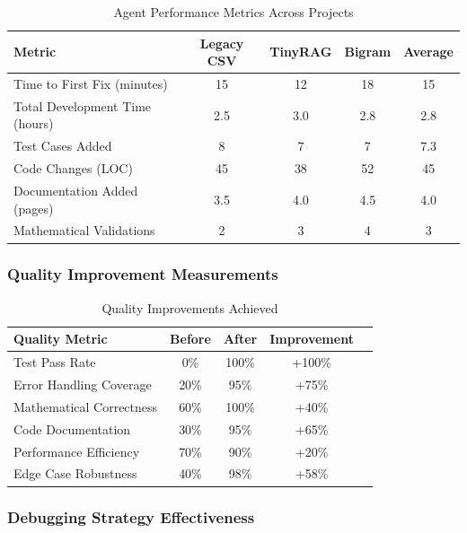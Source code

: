 \documentclass[12pt, a4paper]{article}
\begin{document}
\begin{table}[H]
    \centering
    \caption{Agent Performance Metrics Across Projects}
    \begin{tabular}{@{}lcccc@{}}
        \toprule
        \textbf{Metric} & \textbf{Legacy CSV} & \textbf{TinyRAG} & \textbf{Bigram} & \textbf{Average} \\
        \midrule
        Time to First Fix (minutes) & 15 & 12 & 18 & 15 \\
        Total Development Time (hours) & 2.5 & 3.0 & 2.8 & 2.8 \\
        Test Cases Added & 8 & 7 & 7 & 7.3 \\
        Code Changes (LOC) & 45 & 38 & 52 & 45 \\
        Documentation Added (pages) & 3.5 & 4.0 & 4.5 & 4.0 \\
        Mathematical Validations & 2 & 3 & 4 & 3 \\
        \bottomrule
    \end{tabular}
    \label{tab:agent_performance_metrics}
\end{table}

\subsubsection{Quality Improvement Measurements}

\begin{table}[H]
    \centering
    \caption{Quality Improvements Achieved}
    \begin{tabular}{@{}lcccc@{}}
        \toprule
        \textbf{Quality Metric} & \textbf{Before} & \textbf{After} & \textbf{Improvement} \\
        \midrule
        Test Pass Rate & 0\% & 100\% & +100\% \\
        Error Handling Coverage & 20\% & 95\% & +75\% \\
        Mathematical Correctness & 60\% & 100\% & +40\% \\
        Code Documentation & 30\% & 95\% & +65\% \\
        Performance Efficiency & 70\% & 90\% & +20\% \\
        Edge Case Robustness & 40\% & 98\% & +58\% \\
        \bottomrule
    \end{tabular}
    \label{tab:quality_improvements}
\end{table}

\subsubsection{Debugging Strategy Effectiveness}
\end{document}
